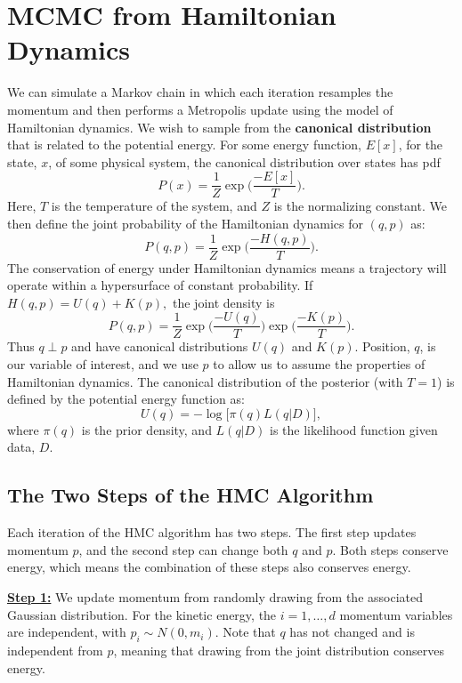 \documentclass[twoside]{article}
\begin{document}
\section{MCMC from Hamiltonian Dynamics}
We can simulate a Markov chain in which each iteration resamples the momentum and then performs a Metropolis update using the model of Hamiltonian dynamics. We wish to sample from the \textbf{canonical distribution} that is related to the potential energy. For some energy function, $E[x]$, for the state, $x$, of some physical system, the canonical distribution over states has pdf
$$P(x) = \frac{1}{Z}\exp \Bigg(\frac{-E[x]}{T}\Bigg).$$
Here, $T$ is the temperature of the system, and $Z$ is the normalizing constant. We then define the joint probability of the Hamiltonian dynamics for $(q,p)$ as:
$$P(q,p) =\frac{1}{Z} \exp \Bigg(\frac{-H(q,p)}{T}\Bigg).$$ The conservation of energy under Hamiltonian dynamics means a trajectory will operate within a hypersurface of constant probability. If $H(q,p)=U(q)+K(p),$ the joint density is
$$P(q,p)=\frac{1}{Z}\exp \Bigg(\frac{-U(q)}{T}\Bigg)\exp \Bigg(\frac{-K(p)}{T}\Bigg).$$
Thus $q \perp p$ and have canonical distributions $U(q)$ and $K(p)$. Position, $q$, is our variable of interest, and we use $p$ to allow us to assume the properties of Hamiltonian dynamics. The canonical distribution of the posterior (with $T=1$) is defined by the potential energy function as:
$$U(q)=-\log\big[\pi(q)L(q|D)\big],$$
where $\pi(q)$ is the prior density, and $L(q|D)$ is the likelihood function given data, $D$.

\subsection{The Two Steps of the HMC Algorithm}
Each iteration of the HMC algorithm has two steps. The first step updates momentum $p$, and the second step can change both $q$ and $p$. Both steps conserve energy, which means the combination of these steps also conserves energy. 

\underline{\textbf{Step 1:}} We update momentum from randomly drawing from the associated Gaussian distribution. For the kinetic energy, the $i = 1,\ldots,d$ momentum variables are independent, with $p_i \sim N(0,m_i)$. Note that $q$ has not changed and is independent from $p$, meaning that drawing from the joint distribution conserves energy. 
\end{document}
